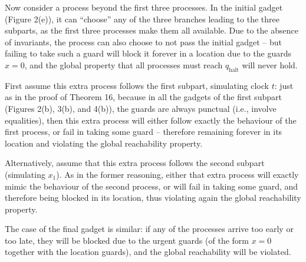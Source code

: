  
 
Now consider a process beyond the first three processes. In the initial gadget (Figure 2(e)), it can “choose” any of the three branches leading to the three subparts, as the first three processes make them all available. Due to the absence of invariants, the process can also choose to not pass the initial gadget -- but failing to take such a guard will block it forever in a location due to the guards $x=0$, and the global property that all processes must reach $q_{\textrm{halt}}$ will never hold.\par
 
 
 
First assume this extra process follows the first subpart, simulating clock $t$: just as in the proof of Theorem 16, because in all the gadgets of the first subpart (Figures 2(b), 3(b), and 4(b)), the guards are always punctual (i.e., involve equalities), then this extra process will either follow exactly the behaviour of the first process, or fail in taking some guard -- therefore remaining forever in its location and violating the global reachability property.\par
 
 
 
Alternatively, assume that this extra process follows the second subpart (simulating $x_{1}$). As in the former reasoning, either that extra process will exactly mimic the behaviour of the second process, or will fail in taking some guard, and therefore being blocked in its location, thus violating again the global reachability property.\par
 
 
 
The case of the final gadget is similar: if any of the processes arrive too early or too late, they will be blocked due to the urgent guards (of the form $x=0$ together with the location guards), and the global reachability will be violated.\par
 
 
 
